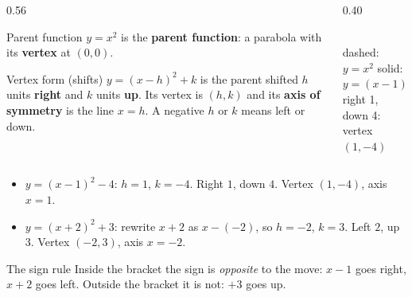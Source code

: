 \documentclass[aspectratio=169, 11pt]{beamer}
\newcommand{\qgrid}[4]{%
  \draw[step=1, linegray!45, very thin] (#1,#3) grid (#2,#4);
  \draw[->, thick, charcoal] (#1,0)--(#2,0) node[below right, font=\tiny]{$x$};
  \draw[->, thick, charcoal] (0,#3)--(0,#4) node[left, font=\tiny]{$y$};}
\newcommand{\fdot}[3]{\fill[#1] (#2,#3) circle (5.5pt);}
\begin{document}
\begin{frame}[t, plain]
  \begin{columns}[T]
    \begin{column}{0.56\textwidth}
      \begin{block}{Parent function}
        $y=x^2$ is the \textbf{parent function}: a parabola with its \textbf{vertex} at
        $(0,0)$.
      \end{block}
      \vspace{2pt}
      \begin{block}{Vertex form (shifts)}
        $y=(x-h)^2+k$ is the parent shifted $h$ units \textbf{right} and $k$ units
        \textbf{up}. Its vertex is $(h,k)$ and its \textbf{axis of symmetry} is the line
        $x=h$. A negative $h$ or $k$ means left or down.
      \end{block}
    \end{column}
    \begin{column}{0.40\textwidth}
      \centering
      \\[-2pt]
      {\scriptsize dashed: $y=x^2$ \quad solid: $y=(x-1)^2-4$ \\ right 1, down 4: vertex
      $(1,-4)$}
    \end{column}
  \end{columns}
\end{frame}

\begin{frame}[t, plain]
  \begin{itemize}\setlength{\itemsep}{8pt}
    \item $y=(x-1)^2-4$: \; $h=1$, $k=-4$. \pause \; Right $1$, down $4$. Vertex $(1,-4)$, axis
          $x=1$.
    \pause
    \item $y=(x+2)^2+3$: \; rewrite $x+2$ as $x-(-2)$, so $h=-2$, $k=3$. \pause \; Left $2$,
          up $3$. Vertex $(-2,3)$, axis $x=-2$.
  \end{itemize}
  \pause
  \vspace{6pt}
  \begin{block}{The sign rule}
    Inside the bracket the sign is \emph{opposite} to the move: $x-1$ goes right, $x+2$ goes
    left. Outside the bracket it is not: $+3$ goes up.
  \end{block}
\end{frame}
\end{document}
